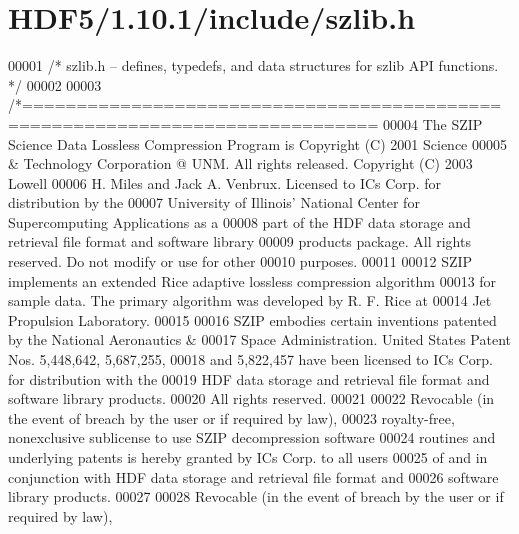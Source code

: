 \hypertarget{_h_d_f5_21_810_81_2include_2szlib_8h_source}{}\section{H\+D\+F5/1.10.1/include/szlib.h}
\label{_h_d_f5_21_810_81_2include_2szlib_8h_source}

\begin{DoxyCode}
00001 \textcolor{comment}{/* szlib.h -- defines, typedefs, and data structures for szlib API functions. */}
00002 
00003 \textcolor{comment}{/*==============================================================================}
00004 \textcolor{comment}{The SZIP Science Data Lossless Compression Program is Copyright (C) 2001 Science}
00005 \textcolor{comment}{& Technology Corporation @ UNM.  All rights released.  Copyright (C) 2003 Lowell}
00006 \textcolor{comment}{H. Miles and Jack A. Venbrux.  Licensed to ICs Corp. for distribution by the}
00007 \textcolor{comment}{University of Illinois' National Center for Supercomputing Applications as a}
00008 \textcolor{comment}{part of the HDF data storage and retrieval file format and software library}
00009 \textcolor{comment}{products package.  All rights reserved.  Do not modify or use for other}
00010 \textcolor{comment}{purposes.}
00011 \textcolor{comment}{}
00012 \textcolor{comment}{SZIP implements an extended Rice adaptive lossless compression algorithm}
00013 \textcolor{comment}{for sample data.  The primary algorithm was developed by R. F. Rice at}
00014 \textcolor{comment}{Jet Propulsion Laboratory.}
00015 \textcolor{comment}{}
00016 \textcolor{comment}{SZIP embodies certain inventions patented by the National Aeronautics &}
00017 \textcolor{comment}{Space Administration.  United States Patent Nos. 5,448,642, 5,687,255,}
00018 \textcolor{comment}{and 5,822,457 have been licensed to ICs Corp. for distribution with the}
00019 \textcolor{comment}{HDF data storage and retrieval file format and software library products.}
00020 \textcolor{comment}{All rights reserved.}
00021 \textcolor{comment}{}
00022 \textcolor{comment}{Revocable (in the event of breach by the user or if required by law),}
00023 \textcolor{comment}{royalty-free, nonexclusive sublicense to use SZIP decompression software}
00024 \textcolor{comment}{routines and underlying patents is hereby granted by ICs Corp. to all users}
00025 \textcolor{comment}{of and in conjunction with HDF data storage and retrieval file format and}
00026 \textcolor{comment}{software library products.}
00027 \textcolor{comment}{}
00028 \textcolor{comment}{Revocable (in the event of breach by the user or if required by law),}

\end{DoxyCode}
